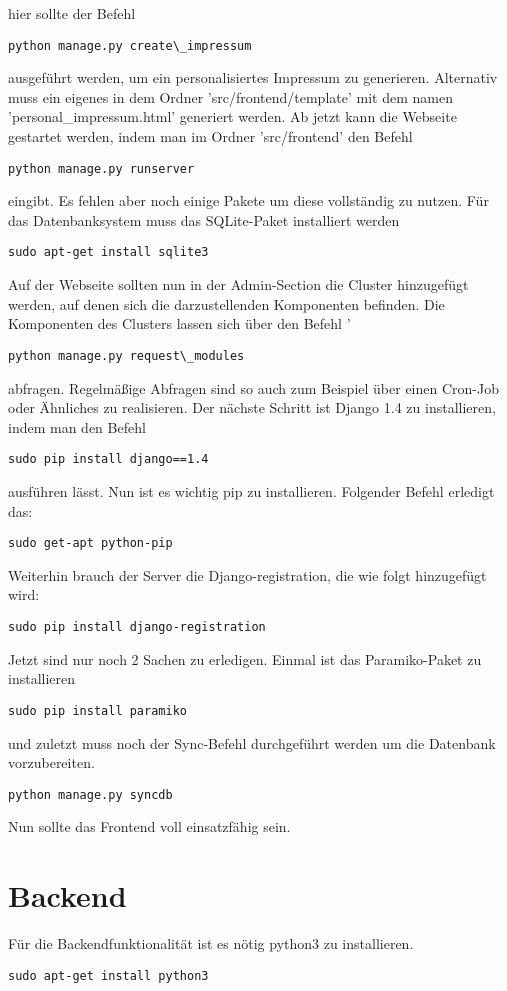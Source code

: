 hier sollte der Befehl 
\begin{lstlisting}
python manage.py create\_impressum
\end{lstlisting}
 ausgeführt werden, um ein personalisiertes Impressum zu generieren. Alternativ muss ein eigenes 
in dem Ordner 'src/frontend/template' mit dem namen
'personal\_impressum.html' generiert werden. Ab jetzt kann die Webseite gestartet
werden, indem man im Ordner 'src/frontend' den Befehl
\begin{lstlisting}
python manage.py runserver 
\end{lstlisting}
eingibt. Es fehlen aber noch einige Pakete um diese vollständig zu nutzen.
Für das Datenbanksystem muss das SQLite-Paket installiert werden
\begin{lstlisting}
sudo apt-get install sqlite3
\end{lstlisting}
Auf der Webseite sollten nun in der Admin-Section die Cluster hinzugefügt werden,
auf denen sich die darzustellenden Komponenten befinden. Die Komponenten des
Clusters lassen sich über den Befehl '
\begin{lstlisting}
python manage.py request\_modules
\end{lstlisting}
abfragen. Regelmäßige Abfragen sind so auch zum Beispiel über einen Cron-Job
oder Ähnliches zu realisieren.
\newpage
Der nächste Schritt ist Django 1.4 zu installieren, indem man den Befehl
\begin{lstlisting}
sudo pip install django==1.4
\end{lstlisting}
ausführen lässt. 
Nun ist es wichtig pip zu installieren. Folgender Befehl erledigt das:
\begin{lstlisting}
sudo get-apt python-pip
\end{lstlisting}
Weiterhin brauch der Server die Django-registration, die wie folgt hinzugefügt wird:
\begin{lstlisting}
sudo pip install django-registration
\end{lstlisting}
Jetzt sind nur noch 2 Sachen zu erledigen. Einmal ist das Paramiko-Paket zu installieren 
\begin{lstlisting}
sudo pip install paramiko
\end{lstlisting}
und zuletzt muss noch der Sync-Befehl durchgeführt werden um die Datenbank vorzubereiten.
\begin{lstlisting}
python manage.py syncdb
\end{lstlisting}
Nun sollte das Frontend voll einsatzfähig sein.
\section{Backend}
Für die Backendfunktionalität ist es nötig python3 zu installieren.
\begin{lstlisting}
sudo apt-get install python3
\end{lstlisting}



